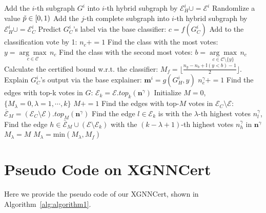 \begin{algorithm}[!t]
\begin{algorithmic}[1]
\STATE Add the $i$-th subgraph $G^i$ into $i$-th hybrid subgraph by $\mathcal{E}_{H}^{i}\cup = \mathcal{E}^{i}$
\STATE Randomlize a value $\Tilde{p}\in[0,1)$
\STATE Add the $j$-th complete subgraph into $i$-th hybrid subgraph by $\mathcal{E}_{H}^{i}\cup = \mathcal{E}^{i}_{C}$
\ENDIF
\ENDFOR
\ENDFOR
{}
\STATE Predict $G^{i}_{C}$'s label via the base classifier: $c=f(G^{i}_{C})$
\STATE Add to the classification vote by 1: $n_c+=1$
\ENDFOR
\STATE Find the class with the most votes: $y = \underset{c \in \mathcal{C}}{{\arg\max}} \, n_c$
\STATE Find the class with the second most votes: $b = \underset{c \in \mathcal{C}\setminus\{y\}}{{\arg\max}} \, n_c$
\STATE Calculate the certified bound w.r.t. the classifier: $M_{f} = \lfloor \frac{n_y-n_{b} + \mathbb{I}(y<b)-1}{2} \rfloor$.
\STATE Explain $G^{i}_{C}$'s output via the base explainer: $\textbf{m}^{i}=g(G_H^{i},y)$
\STATE $n_{e}^{\gamma}+=1$
\ENDIF
\ENDFOR
\ENDFOR
\STATE Find the edges with top-k votes in $G$: $\mathcal{E}_{k}=\mathcal{E}.top_{k}(\textbf{n}^{\gamma})$
\STATE Initialize $M=0$, $\{{  M_\lambda}=0, \lambda=1,\cdots,k\}$ 
\STATE $M+=1$
\STATE Find the edges with top-$M$ votes in $\mathcal{E}_{C}\setminus\mathcal{E}$: $\overline{\mathcal{E}}_{M}=(\mathcal{E}_{C}\setminus\mathcal{E}).top_{M}(\textbf{n}^{\gamma})$
\FOR{$\lambda \in [1,k]$}
\STATE Find the edge $l \in \mathcal{E}_k$ is with the $\lambda$-th highest votes $n_{l}^{\gamma}$, 
 \STATE Find the edge 
  $h \in \bar{\mathcal{E}}_{M} \cup (\mathcal{E} \setminus \mathcal{E}_k)$ 
 with the $(k-\lambda+1)$-th highest votes ${n}_{h}^{\gamma}$ in ${\textbf{n}}^{\gamma}$ 
\STATE ${  M_\lambda}=M$
\ENDIF
\ENDFOR
\ENDWHILE
\FOR{$\lambda\in [1,k]$}
\STATE ${  M_\lambda}=\text{min}({  M_\lambda},M_{f})$
\ENDFOR
{} 
\end{algorithmic}
\end{algorithm}



\section{Pseudo Code on XGNNCert}


{Here we provide the pseudo code of our XGNNCert, shown in Algorithm~\ref{alg:algorithm1}}.




